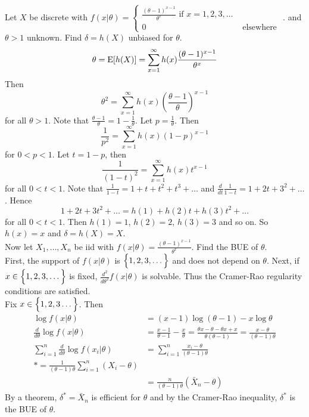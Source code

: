 \documentclass[12pt]{article}
\begin{document}
Let $X$ be discrete with $f(x|\theta) =\begin{cases} \frac{(\theta-1)^{x-1}}{\theta^x} \text{ if } x = 1,2,3,\dots \\ 0 &\text{ elsewhere } \end{cases} $. and $\theta > 1$ unknown. Find $\delta = h(X)$ unbiased for $\theta$. \\
$$ \theta = \mathrm{E}[ h(X) ] = \sum_{x=1}^\infty h(x) \frac{(\theta-1)^{x-1}}{\theta^x} $$ Then $$ \theta^2 = \sum_{x=1}^\infty h(x) (\frac{\theta-1}{\theta})^{x-1}$$ for all $\theta > 1$. Note that $\frac{\theta-1}{\theta} = 1 - \frac{1}{\theta}$. Let $p = \frac{1}{\theta}$. Then $$ \frac{1}{p^2} = \sum_{x=1}^\infty h(x) (1-p)^{x-1} $$ for $0 < p < 1$. Let $t = 1-p$, then $$ \frac{1}{(1-t)^2} = \sum_{x=1}^\infty h(x)t^{x-1} $$ for all $0 < t < 1$. Note that $\frac{1}{1-t} = 1 + t + t^2 + t^3 + \dots $ and $\frac{d}{dt} \frac{1}{1-t} = 1 + 2t + 3^2 + \dots$. Hence 
$$ 1 + 2t + 3t^2 + \dots = h(1) + h(2)t + h(3)t^2 + \dots $$ for all $0 < t < 1$. Then $h(1) = 1$, $h(2)=2$, $h(3)=3$ and so on. So $h(x) = x$ and $\delta = h(X) = X$. \\
Now let $X_1,\dots,X_n$ be iid with $f(x | \theta) = \frac{(\theta-1)^{x-1}}{\theta^x}$. Find the BUE of $\theta$. \\
First, the support of $f(x|\theta)$ is $\Big\{ 1,2,3,\dots \Big\}$ and does not depend on $\theta$. Next, if $x \in \Big\{ 1,2,3,\dots \Big\}$ is fixed, $\frac{d^2}{d\theta^2} f(x | \theta)$ is solvable. Thus the Cramer-Rao regularity conditions are satisfied. \\
Fix $x \in \Big\{ 1,2,3\dots \Big\}$. Then $$ \begin{aligned} \log f(x|\theta) &= (x-1)\log (\theta -1) - x\log \theta \\ \frac{d}{d\theta} \log f(x | \theta) &= \frac{x-1}{\theta-1} - \frac{x}{\theta} = \frac{\theta x - \theta - \theta x + x}{\theta(\theta -1)} = \frac{x-\theta}{(\theta-1)\theta} \\ \sum_{i=1}^n \frac{d}{d\theta} \log f(x_i | \theta) &= \sum_{i=1}^n \frac{x_i - \theta}{(\theta-1)\theta} \\ *= \frac{1}{(\theta-1)\theta} \sum_{i=1}^n (X_i - \theta) \\ &= \frac{n}{(\theta-1)\theta}(\bar{X}_n - \theta) \end{aligned} $$ 
By a theorem, $\delta^* = \bar{X}_n$ is efficient for $\theta$ and by the Cramer-Rao inequality, $\delta^*$ is the BUE of $\theta$. \\~\\
\end{document}
